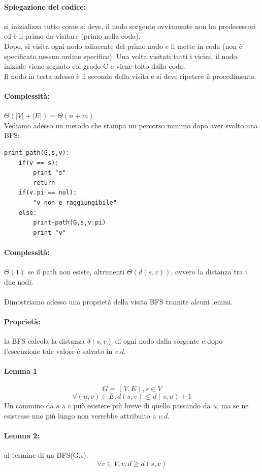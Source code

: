 \documentclass[a4paper,12pt]{article}
\begin{document}
\paragraph{Spiegazione del codice:} si inizializza tutto come si deve, il nodo sorgente ovviamente non ha predecessori ed è il primo da visitare (primo nella coda).\\
Dopo, si visita ogni nodo adiacente del primo nodo e li mette in coda (non è specificato nessun ordine specifico). Una volta visitati tutti i vicini, il nodo iniziale viene segnato col grado C e viene tolto dalla coda.\\
Il nodo in testa adesso è il secondo della visita e si deve ripetere il procedimento.\\
\paragraph{Complessità:} $\Theta(|V| + |E|) = \Theta(n + m)$ \\
Vediamo adesso un metodo che stampa un percorso minimo dopo aver svolto una BFS:
\begin{lstlisting}
print-path(G,s,v):
    if(v == s):
        print "s"
        return
    if(v.pi == nul):
        "v non e raggiungibile"
    else:
        print-path(G,s,v.pi)
        print "v"
\end{lstlisting}
\paragraph{Complessità:} $\Theta(1)$ se il path non esiste, altrimenti $\Theta(d(s,v))$, ovvero la distanza tra i due nodi.\\\\
Dimostriamo adesso una proprietà della visita BFS tramite alcuni lemmi.
\paragraph{Proprietà:} la BFS calcola la distanza $\delta(s,v)$ di ogni nodo dalla sorgente e dopo l'esecuzione tale valore è salvato in $v.d$.\\
\paragraph{Lemma 1}
\[
G = (V,E), s \in V
\]
\[
\forall (u,v) \in E, d(s,v) \leq d(s,u) + 1
\]
Un cammino da $s$ a $v$ può esistere più breve di quello passando da $u$, ma se ne esistesse uno più lungo non verrebbe attribuito a $v.d$.
\paragraph{Lemma 2:} al termine di un BFS(G,s):
\[
\forall v \in V, v,d \geq d(s,v)
\]
\end{document}
